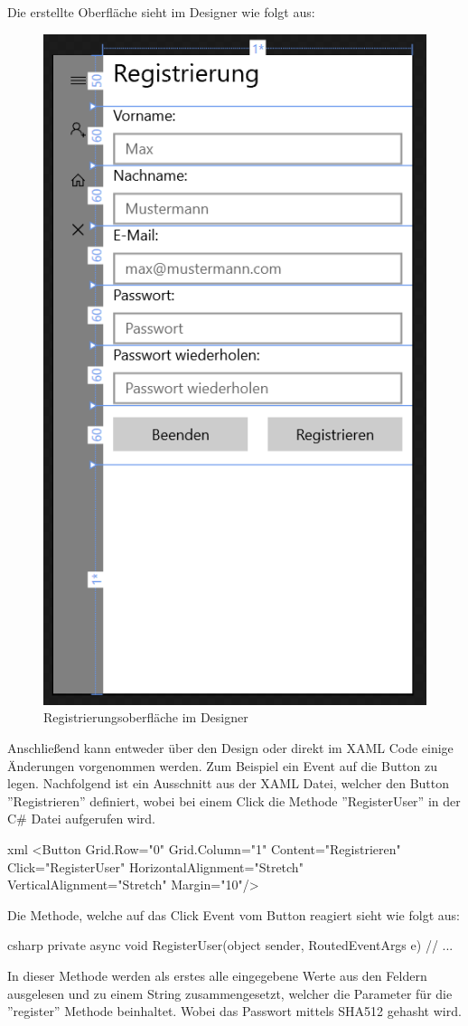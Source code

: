 \clearpage

Die erstellte Oberfläche sieht im Designer wie folgt aus:

\begin{figure}[H]
	\centering
	\includegraphics[width=0.4\linewidth]{images/screenshot003}
	\caption{Registrierungsoberfläche im Designer}
	\label{fig:screenshot003}
\end{figure}

Anschließend kann entweder über den Design oder direkt im XAML Code einige Änderungen vorgenommen werden. Zum Beispiel ein Event auf die Button zu legen. Nachfolgend ist ein Ausschnitt aus der XAML Datei, welcher den Button ''Registrieren'' definiert, wobei bei einem Click die Methode ''RegisterUser'' in der C\# Datei aufgerufen wird.

\begin{code}{xml}
	<Button Grid.Row="0" Grid.Column="1" Content="Registrieren" Click="RegisterUser" HorizontalAlignment="Stretch" VerticalAlignment="Stretch" Margin="10"/>
\end{code}

Die Methode, welche auf das Click Event vom Button reagiert sieht wie folgt aus:

\begin{code}{csharp}
	private async void RegisterUser(object sender, RoutedEventArgs e)
	{
		// ...
	}
\end{code}

In dieser Methode werden als erstes alle eingegebene Werte aus den Feldern ausgelesen und zu einem String zusammengesetzt, welcher die Parameter für die ''register'' Methode beinhaltet. Wobei das Passwort mittels SHA512 gehasht wird. \cite{uwphash}

